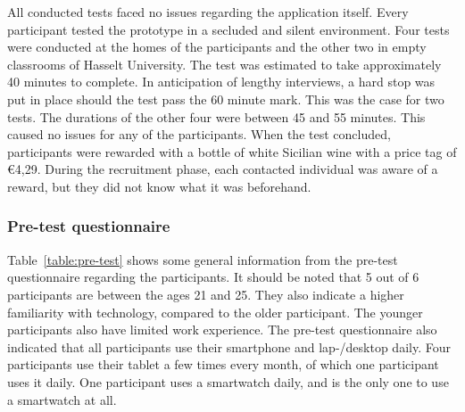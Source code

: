     All conducted tests faced no issues regarding the application itself. Every participant tested the prototype in a secluded and silent environment. Four tests were conducted at the homes of the participants and the other two in empty classrooms of Hasselt University. The test was estimated to take approximately 40 minutes to complete. In anticipation of lengthy interviews, a hard stop was put in place should the test pass the 60 minute mark. This was the case for two tests. The durations of the other four were between 45 and 55 minutes. This caused no issues for any of the participants. When the test concluded, participants were rewarded with a bottle of white Sicilian wine with a price tag of \euro 4,29. During the recruitment phase, each contacted individual was aware of a reward, but they did not know what it was beforehand. %

    \subsubsection{Pre-test questionnaire}

    Table~\ref{table:pre-test} shows some general information from the pre-test questionnaire regarding the participants. It should be noted that 5 out of 6 participants are between the ages 21 and 25. They also indicate a higher familiarity with technology, compared to the older participant. The younger participants also have limited work experience. The pre-test questionnaire also indicated that all participants use their smartphone and lap-/desktop daily. Four participants use their tablet a few times every month, of which one participant uses it daily. One participant uses a smartwatch daily, and is the only one to use a smartwatch at all.
    
